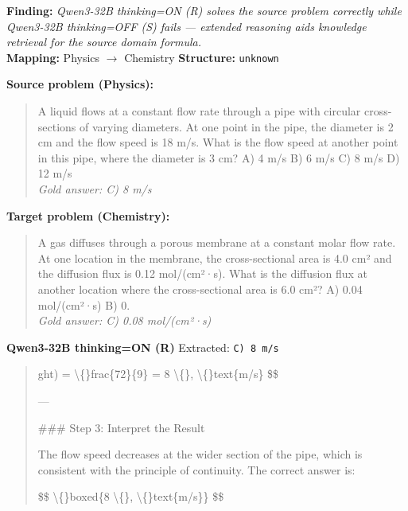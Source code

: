 \begin{tcolorbox}[
  colback=gray!5, colframe=gray!40,
  title={\textbf{Example 6: Reasoning Mode Helps (Source Domain Only)}},
  fonttitle=\small\bfseries, breakable]

\textbf{Finding:} \textit{Qwen3-32B thinking=ON (R) solves the source problem correctly while Qwen3-32B thinking=OFF (S) fails — extended reasoning aids knowledge retrieval for the source domain formula.}
\\[4pt]
\textbf{Mapping:} Physics $\to$ Chemistry \quad
\textbf{Structure:} \texttt{unknown}

\vspace{6pt}
\textbf{Source problem (Physics):}\\
\begin{quote}\small A liquid flows at a constant flow rate through a pipe with circular cross-sections of varying diameters. At one point in the pipe, the diameter is 2 cm and the flow speed is 18 m/s. What is the flow speed at another point in this pipe, where the diameter is 3 cm?
A) 4 m/s
B) 6 m/s
C) 8 m/s
D) 12 m/s\\
\textit{Gold answer: C) 8 m/s}\end{quote}

\textbf{Target problem (Chemistry):}\\
\begin{quote}\small A gas diffuses through a porous membrane at a constant molar flow rate. At one location in the membrane, the cross-sectional area is 4.0 cm² and the diffusion flux is 0.12 mol/(cm²·s). What is the diffusion flux at another location where the cross-sectional area is 6.0 cm²?
A) 0.04 mol/(cm²·s)
B) 0.\\
\textit{Gold answer: C) 0.08 mol/(cm²·s)}\end{quote}

\vspace{4pt}
\textbf{Qwen3-32B thinking=ON (R)} \textcolor{darkgreen}{\cmark} Extracted: \texttt{C) 8 m/s}
\begin{quote}\scriptsize\ttfamily [...] ght) = \textbackslash\{\}frac\{72\}\{9\} = 8 \textbackslash\{\}, \textbackslash\{\}text\{m/s\}
\$\$

---

\#\#\# Step 3: Interpret the Result

The flow speed decreases at the wider section of the pipe, which is consistent with the principle of continuity. The correct answer is:

\$\$
\textbackslash\{\}boxed\{8 \textbackslash\{\}, \textbackslash\{\}text\{m/s\}\}
\$\$


\end{quote}
\end{tcolorbox}
